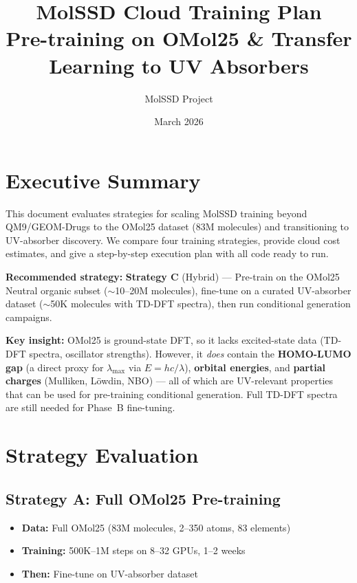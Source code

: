 \documentclass[11pt,a4paper]{article}
\title{\textbf{MolSSD Cloud Training Plan}\\[0.5em]
\large Pre-training on OMol25 \& Transfer Learning to UV Absorbers}
\author{MolSSD Project}
\date{March 2026}
\begin{document}
\maketitle
\tableofcontents
\newpage

\section{Executive Summary}

This document evaluates strategies for scaling MolSSD training beyond QM9/GEOM-Drugs
to the OMol25 dataset (83M molecules) and transitioning to UV-absorber discovery.
We compare four training strategies, provide cloud cost estimates, and give a
step-by-step execution plan with all code ready to run.

\textbf{Recommended strategy:} \textbf{Strategy C} (Hybrid) --- Pre-train on the
OMol25 Neutral organic subset ($\sim$10--20M molecules), fine-tune on a curated
UV-absorber dataset ($\sim$50K molecules with TD-DFT spectra), then run conditional
generation campaigns.

\textbf{Key insight:} OMol25 is ground-state DFT, so it lacks excited-state data
(TD-DFT spectra, oscillator strengths). However, it \emph{does} contain the
\textbf{HOMO-LUMO gap} (a direct proxy for $\lambda_\text{max}$ via $E = hc/\lambda$),
\textbf{orbital energies}, and \textbf{partial charges} (Mulliken, L\"owdin, NBO)
--- all of which are UV-relevant properties that can be used for pre-training
conditional generation. Full TD-DFT spectra are still needed for Phase~B
fine-tuning.

\section{Strategy Evaluation}

\subsection{Strategy A: Full OMol25 Pre-training}

\begin{itemize}[nosep]
    \item \textbf{Data:} Full OMol25 (83M molecules, 2--350 atoms, 83 elements)
    \item \textbf{Training:} 500K--1M steps on 8--32 GPUs, 1--2 weeks
    \item \textbf{Then:} Fine-tune on UV-absorber dataset
\end{itemize}
\end{document}
